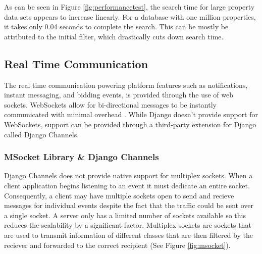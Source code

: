 As can be seen in Figure \ref{fig:performancetest}, the search time for large
property data sets appears to increase linearly. For a database with one million
properties, it takes only 0.04 seconds to complete the search. This can be mostly
be attributed to the initial filter, which drastically cuts down search time.

\subsection{Real Time Communication}\label{realtime}

The real time communication powering platform features such as notifications,
instant messaging, and bidding events, is provided through the use of web
sockets. WebSockets allow for bi-directional messages to be instantly
communicated with minimal overhead \parencite{websocket}. While Django doesn't
provide support for WebSockets, support can be provided through a third-party
extension for Django called Django Channels.

\subsubsection{MSocket Library \& Django Channels}

Django Channels does not provide native support for multiplex sockets. When
a client application begins listening to an event it must dedicate an entire
socket. Consequently, a client may have multiple sockets open to send and
recieve messages for individual events despite the fact that the traffic could
be sent over a single socket. A server only has a limited number of sockets
available so this reduces the scalability by a significant factor. Multiplex
sockets are sockets that are used to transmit information of different classes
that are then filtered by the reciever and forwarded to the correct recipient
(See Figure \ref{fig:msocket}).

